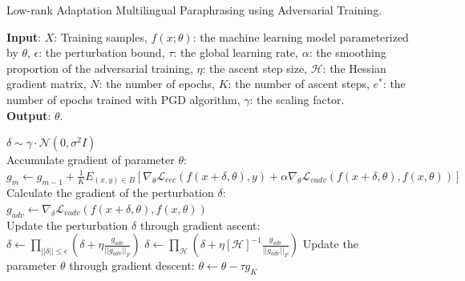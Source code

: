 \documentclass[letterpaper]{article} %
\begin{document}
\begin{algorithm*}[ht]
\fontsize{10pt}{10pt}\selectfont
\caption{Low-rank Adaptation Multilingual Paraphrasing using Adversarial Training.}
\label{alg:main_algo}
    \textbf{Input}: $X$: Training samples, $f(x; \theta)$: the machine learning model parameterized by $\theta$, $\epsilon$: the perturbation bound, $\tau$: the global learning rate, $\alpha$: the smoothing proportion of the adversarial training, $\eta$: the  ascent step size, $\mathcal{H}$: the Hessian gradient matrix, $N$: the number of epochs, $K$: the number of ascent steps, $e^*$: the number of epochs trained with PGD algorithm, $\gamma$: the scaling factor. \\
    \textbf{Output}: $\theta$.
    \begin{algorithmic}[1]
            \STATE $\delta \sim \gamma \cdot \mathcal{N}(0,\sigma^{2}I)$
            \\
                \STATE Accumulate gradient of parameter $\theta$:
                \\
                \STATE $g_{m} \leftarrow  g_{m-1} + \frac{1}{K} E_{(x,y) \in B} [\nabla_{\theta} \mathcal{L}_{rec}(f(x + \delta,\theta), y) +\alpha \nabla_{\theta}\mathcal{L}_{vadv}(f(x+\delta,\theta),f(x,\theta))]$
                \\
                \STATE Calculate the gradient of the perturbation $\delta$:
                \\
                \STATE $g_{adv} \leftarrow \nabla_{\delta}\mathcal{L}_{vadv}(f(x + \delta, \theta), f(x, \theta))$
                \\
                \STATE Update the perturbation $\delta$ through gradient ascent:
                \\
                \STATE $\delta \leftarrow \prod_{||\delta|| \leq \epsilon} (\delta + \eta \frac{g_{adv}}{||g_{adv}||_F})$
                \ELSE
                \STATE $\delta \leftarrow \prod_{\mathcal{H}} (\delta + \eta [\mathcal{H}]^{-1} \frac{g_{adv}}{||g_{adv}||_F})$
                \ENDIF
            \ENDFOR
            \STATE Update the parameter $\theta$ through gradient descent:
            \STATE $\theta \leftarrow \theta - \tau g_{K}$
        \ENDFOR
    \ENDFOR
    \end{algorithmic}
\end{algorithm*}
\end{document}
